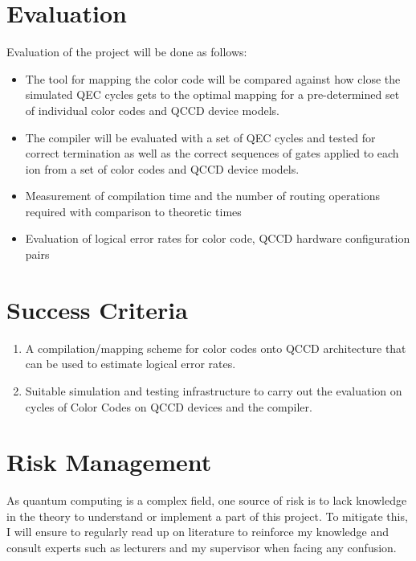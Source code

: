\section{Evaluation}\label{eval}
Evaluation of the project will be done as follows:
\begin{itemize}
    \item The tool for mapping the color code will be compared against how close the simulated QEC cycles gets to the optimal mapping for a pre-determined set of individual color codes and QCCD device models.
    \item The compiler will be evaluated with a set of QEC cycles and tested for correct termination as well as the correct sequences of gates applied to each ion from a set of color codes and QCCD device models.
    \item Measurement of compilation time and the number of routing operations required with comparison to theoretic times
    \item Evaluation of logical error rates for color code, QCCD hardware configuration pairs
\end{itemize}


\section{Success Criteria}
\begin{enumerate}
    \item A compilation/mapping scheme for color codes onto QCCD architecture that can be used to estimate logical error rates.
    \item Suitable simulation and testing infrastructure to carry out the evaluation  on cycles of Color Codes on QCCD devices and the compiler.
\end{enumerate}


\section{Risk Management}
As quantum computing is a complex field, one source of risk is to lack knowledge in the theory to understand or implement a part of this project. To mitigate this, I will ensure to regularly read up on literature to reinforce my knowledge and consult experts such as lecturers and my supervisor when facing any confusion.

